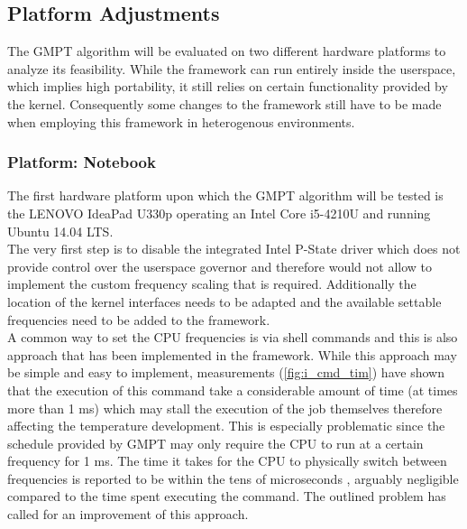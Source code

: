 \subsection{Platform Adjustments}\label{chap:plat_adj}
The GMPT algorithm will be evaluated on two different hardware platforms to analyze its feasibility. While the framework can run entirely inside the userspace, which implies high portability, it still relies on certain functionality provided by the kernel. Consequently some changes to the framework still have to be made when employing this framework in heterogenous environments.
\subsubsection{Platform: Notebook}
The first hardware platform upon which the GMPT algorithm will be tested is the LENOVO IdeaPad U330p operating an Intel Core i5-4210U and running Ubuntu 14.04 LTS.\\
\hspace*{0.5ex}\hspace{0.5ex} The very first step is to disable the integrated Intel P-State driver which does not provide control over the userspace governor and therefore would not allow to implement the custom frequency scaling that is required. Additionally the location of the kernel interfaces needs to be adapted and the available settable frequencies need to be added to the framework.\\
\hspace*{0.5ex}\hspace{0.5ex} A common way to set the CPU frequencies is via shell commands and this is also approach that has been implemented in the framework. While this approach may be simple and easy to implement, measurements (\autoref{fig:i_cmd_tim}) have shown that the execution of this command take a considerable amount of time (at times more than 1 ms) which may stall the execution of the job themselves therefore affecting the temperature development. This is especially problematic since the schedule provided by GMPT may only require the CPU to run at a certain frequency for 1 ms. The time it takes for the CPU to physically switch between frequencies is reported to be within the tens of microseconds \cite{intel_formula,Skadron,Semeraro}, arguably negligible compared to the time spent executing the command. The outlined problem has called for an improvement of this approach.\\
